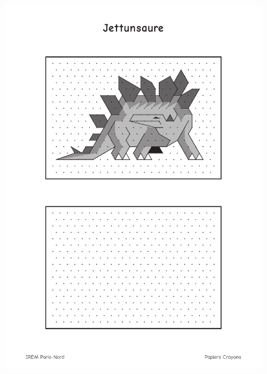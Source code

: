 \begin{figure}[H]
  \centering
  \includegraphics[width=0.95\linewidth]{6xDM/jettunsaure.pdf}
\end{figure}

